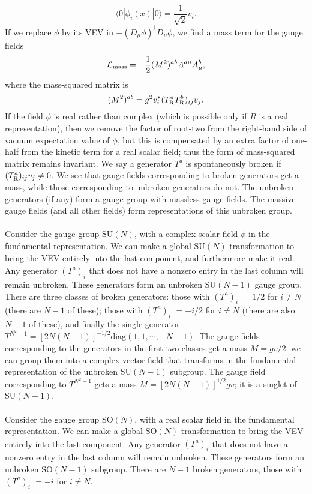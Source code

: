 \[\langle 0 | \phi_i(x) | 0 \rangle = \frac{1}{\sqrt{2}}v_i.\]
If we replace $\phi$ by its VEV in $-(D_{\mu}\phi)^{\dagger}D_{\mu}\phi$, we find a mass term for the gauge fields
\[\mathcal{L}_{\rm mass} = - \frac{1}{2}(M^2)^{ab}A^{a\mu}A^b_{\mu},\]
where the mass-squared matrix is
\[(M^2)^{ab} = g^2 v_i^* (T^a_{\rm R} T^b_{\rm R})_{ij}v_j .\]
If the field $\phi$ is real rather than complex (which is possible only if $R$ is a real representation), then we remove the factor of root-two from the right-hand side of vacuum expectation value of $\phi$, but this is compensated by an extra factor of one-half from the kinetic term for a real scalar field; thus the form of mass-squared matrix remains invariant.
We say a generator $T^a$ is spontaneously broken if $(T^a_{\rm R})_{ij}v_j \neq 0$. We see that gauge fields corresponding to broken generators get a mass, while those corresponding to unbroken generators do not. The unbroken generators (if any) form a gauge group with massless gauge fields. The massive gauge fields (and all other fields) form representations of this unbroken group.
\\ \\
Consider the gauge group $\mathrm{SU}(N)$, with a complex scalar field $\phi$ in the fundamental representation. We can make a global $\mathrm{SU}(N)$ transformation to bring the VEV entirely into the last component, and furthermore make it real. 
Any generator $(T^a)_{i}^{\phantom{j}}$ that does not have a nonzero entry in the last column will remain unbroken. These generators form an unbroken $\mathrm{SU}(N-1)$ gauge group. There are three classes of broken generators: those with $(T^a)_{i}^{\phantom{N}} = {1}/{2}$  for $i \neq N$ (there are $N-1$ of these); those with
$(T^a)_{i}^{\phantom{N}} = -{i}/{2}$  for $i \neq N$ (there are also $N - 1$ of these), and finally the single
generator $T^{N^2 - 1} = [2N(N-1)]^{-1/2} \mathrm{diag}(1,1,\cdots,-N-1)$. 
The gauge fields corresponding to the generators in the first two classes get a mass $M = {gv}/{2}$.
we can group them into a complex vector field that transforms in the fundamental representation of the unbroken $\mathrm{SU}(N-1)$ subgroup. The gauge field corresponding to $T^{N^2-1}$ gets a mass $M = [2N(N-1)]^{1/2}gv$; it is a singlet of $\mathrm{SU}(N-1)$.
\\ \\
Consider the gauge group $\mathrm{SO}(N)$, with a real scalar field in the fundamental representation. We can make a global $\mathrm{SO}(N)$ transformation to bring the VEV entirely into the last component. Any generator $(T^a)_{i}^{\phantom{j}}$ that does not have a nonzero entry in the last column will remain unbroken. These generators form an unbroken $\mathrm{SO}(N-1)$ subgroup. There are $N - 1$ broken generators, those with $(T^a)_{i}^{\phantom{N}} = -i$  for $i \neq N$. 
